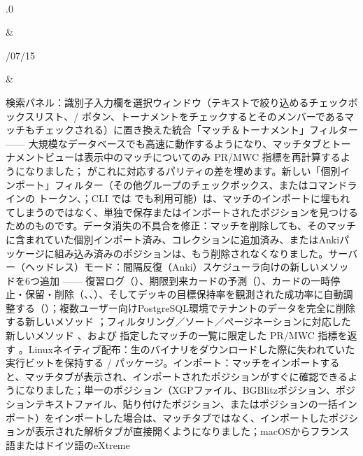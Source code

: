 \documentclass[letterpaper,10pt,dvipdfmx]{sphinxmanual}
\begin{document}
\begin{savenotes}
\begin{longtable}{}
\begin{varwidth}[t]{}
\sphinxbeforeendvarwidth
\end{varwidth}%
\\
\sphinxhline\begin{varwidth}[t]{}
.0
\sphinxbeforeendvarwidth
\end{varwidth}%
&\begin{varwidth}[t]{}
/07/15
\sphinxbeforeendvarwidth
\end{varwidth}%
&\begin{varwidth}[t]{}
\sphinxAtStartPar
検索パネル：識別子入力欄を選択ウィンドウ（テキストで絞り込めるチェックボックスリスト、/ ボタン、トーナメントをチェックするとそのメンバーであるマッチもチェックされる）に置き換えた統合「マッチ＆トーナメント」フィルター —— 大規模なデータベースでも高速に動作するようになり、マッチタブとトーナメントビューは表示中のマッチについてのみ PR/MWC 指標を再計算するようになりました； がこれに対応するパリティの差を埋めます。新しい「個別インポート」フィルター（その他グループのチェックボックス、またはコマンドラインの  トークン、；CLI では  でも利用可能）は、マッチのインポートに埋もれてしまうのではなく、単独で保存またはインポートされたポジションを見つけるためのものです。データ消失の不具合を修正：マッチを削除しても、そのマッチに含まれていた個別インポート済み、コレクションに追加済み、またはAnkiパッケージに組み込み済みのポジションは、もう削除されなくなりました。サーバー（ヘッドレス）モード：間隔反復（Anki）スケジューラ向けの新しいメソッドを6つ追加 —— 復習ログ（）、期限到来カードの予測（）、カードの一時停止・保留・削除（、、）、そしてデッキの目標保持率を観測された成功率に自動調整する（）；複数ユーザー向けPostgreSQL環境でテナントのデータを完全に削除する新しいメソッド ；フィルタリング／ソート／ページネーションに対応した新しいメソッド 、および 指定したマッチの一覧に限定した PR/MWC 指標を返す 。Linuxネイティブ配布：生のバイナリをダウンロードした際に失われていた実行ビットを保持する / パッケージ。インポート：マッチをインポートすると、マッチタブが表示され、インポートされたポジションがすぐに確認できるようになりました；単一のポジション（XGPファイル、BGBlitzポジション、ポジションテキストファイル、貼り付けたポジション、またはポジションの一括インポート）をインポートした場合は、マッチタブではなく、インポートしたポジションが表示された解析タブが直接開くようになりました；macOSからフランス語またはドイツ語のeXtreme 
\end{varwidth}
\end{longtable}
\end{savenotes}
\end{document}
